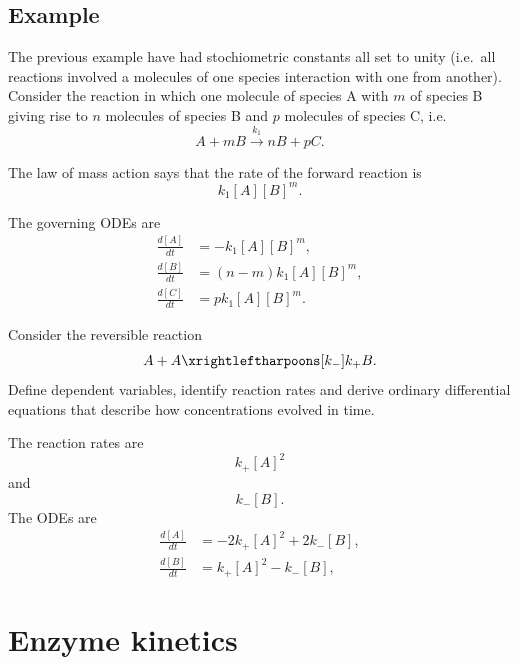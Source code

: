 \documentclass[
  letterpaper,
  DIV=11,
  numbers=noendperiod]{scrreprt}
\begin{document}
\subsection{Example}\label{example-2}

The previous example have had stochiometric constants all set to unity
(i.e.~all reactions involved a molecules of one species interaction with
one from another). Consider the reaction in which one molecule of
species A with \(m\) of species B giving rise to \(n\) molecules of
species B and \(p\) molecules of species C, i.e. \[
A+mB \xrightarrow{k_1} nB + pC.
\]

The law of mass action says that the rate of the forward reaction is \[
k_1[A][B]^m.
\]

The governing ODEs are \[
\begin{aligned}
\frac{d[A]}{dt}&=-k_1[A][B]^m, \nonumber\\
\frac{d[B]}{dt}&=(n-m)k_1[A][B]^m, \nonumber\\
\frac{d[C]}{dt}&=pk_1[A][B]^m.  \nonumber
\end{aligned}
\]

\begin{tcolorbox}[enhanced jigsaw, arc=.35mm, bottomrule=.15mm, bottomtitle=1mm, breakable, colback=white, colbacktitle=quarto-callout-note-color!10!white, colframe=quarto-callout-note-color-frame, coltitle=black, left=2mm, leftrule=.75mm, opacityback=0, opacitybacktitle=0.6, rightrule=.15mm, title=\textcolor{quarto-callout-note-color}{\faInfo}\hspace{0.5em}{Example}, titlerule=0mm, toprule=.15mm, toptitle=1mm]

Consider the reversible reaction \[
A+A  \xrightleftharpoons[k_{-}]{k_{+}}  B.
\] Define dependent variables, identify reaction rates and derive
ordinary differential equations that describe how concentrations evolved
in time.

The reaction rates are \[
k_+[A]^2
\] and \[
k_- [B].
\] The ODEs are \[
\begin{aligned}
\frac{d[A]}{dt}&=-2k_+[A]^2+2k_- [B] , \nonumber\\
\frac{d[B]}{dt}&=k_+[A]^2-k_- [B], 
\end{aligned}
\]

\end{tcolorbox}

\section{Enzyme kinetics}\label{enzyme-kinetics}
\end{document}
